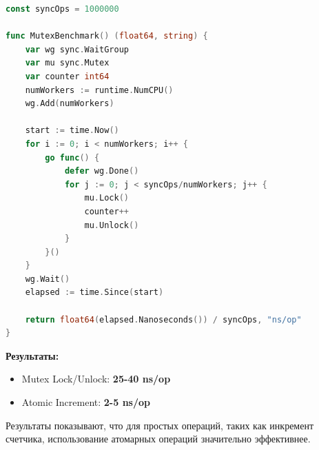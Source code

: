 \begin{lstlisting}[language=Go, caption={Реализация теста мьютекса}]
const syncOps = 1000000

func MutexBenchmark() (float64, string) {
	var wg sync.WaitGroup
	var mu sync.Mutex
	var counter int64
	numWorkers := runtime.NumCPU()
	wg.Add(numWorkers)

	start := time.Now()
	for i := 0; i < numWorkers; i++ {
		go func() {
			defer wg.Done()
			for j := 0; j < syncOps/numWorkers; j++ {
				mu.Lock()
				counter++
				mu.Unlock()
			}
		}()
	}
	wg.Wait()
	elapsed := time.Since(start)

	return float64(elapsed.Nanoseconds()) / syncOps, "ns/op"
}
\end{lstlisting}

\textbf{Результаты:}
\begin{itemize}
    \item Mutex Lock/Unlock: \textbf{25-40 ns/op}
    \item Atomic Increment: \textbf{2-5 ns/op}
\end{itemize}
Результаты показывают, что для простых операций, таких как инкремент счетчика, использование атомарных операций значительно эффективнее.
